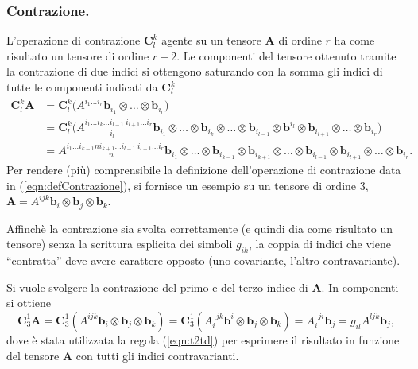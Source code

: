  \subsubsection{Contrazione.} L'operazione di contrazione $\bm{C}^k_l$ agente su un tensore $\bm{A}$ di ordine $r$ ha come risultato un tensore di ordine $r-2$. Le componenti del tensore ottenuto tramite la contrazione di due indici si ottengono saturando con la somma gli indici di tutte le componenti indicati da $\bm{C}^k_l$
\begin{equation}\label{eqn:defContrazione}
\begin{aligned}
 \bm{C}^k_l \bm{A} & =
 \bm{C}^k_l \big(A^{i_1 \dots i_r} \bm{b}_{i_1} \otimes \dots \otimes \bm{b}_{i_r}\big) \\
 & = \bm{C}^k_l \big(A^{i_1 \dots i_k \dots i_{l-1} \ i_{l+1} \dots i_r}_{\qquad \quad \ i_l} \bm{b}_{i_1} \otimes \dots \otimes \bm{b}_{i_k} \otimes \dots \otimes \bm{b}_{i_{l-1}} \otimes  \bm{b}^{i_l} \otimes \bm{b}_{i_{l+1}} \otimes \dots \otimes \bm{b}_{i_r}\big) \\
 & = A^{i_1 \dots i_{k-1} n i_{k+1} \dots i_{l-1} \ i_{l+1} \dots i_r}_{\qquad \qquad \quad \ \ n} \bm{b}_{i_1} \otimes \dots \otimes \bm{b}_{i_{k-1}} \otimes \bm{b}_{i_{k+1}} \otimes \dots \otimes \bm{b}_{i_{l-1}} \otimes \bm{b}_{i_{l+1}} \otimes \dots \otimes \bm{b}_{i_r} .
\end{aligned}
\end{equation}
Per rendere (più) comprensibile la definizione dell'operazione di contrazione data in (\ref{eqn:defContrazione}), si fornisce un esempio su un tensore di ordine 3, $\bm{A} = A^{ijk} \bm{b}_i \otimes \bm{b}_j \otimes \bm{b}_k$.
\begin{remark}
 Affinchè la contrazione sia svolta correttamente (e quindi dia come risultato un tensore) senza la scrittura esplicita dei simboli $g_{ik}$, la coppia di indici che viene ``contratta'' deve avere carattere opposto (uno covariante, l'altro contravariante).
\end{remark}
  Si vuole svolgere la contrazione del primo e del terzo indice di $\bm{A}$. In componenti si ottiene
  \begin{equation}
   \bm{C}^1_3 \bm{A} = \bm{C}^1_3 ( A^{ijk} \bm{b}_i \otimes \bm{b}_j \otimes \bm{b}_k ) =  \bm{C}^1_3 ( A_i^{\ \ jk} \bm{b}^i \otimes \bm{b}_j \otimes \bm{b}_k ) = A_i^{\ \ ji} \bm{b}_j = g_{il} A^{ljk} \bm{b}_j ,
  \end{equation}
  dove è stata utilizzata la regola (\ref{eqn:t2td}) per esprimere il risultato in funzione del tensore $\bm{A}$ con tutti gli indici contravarianti.
  
